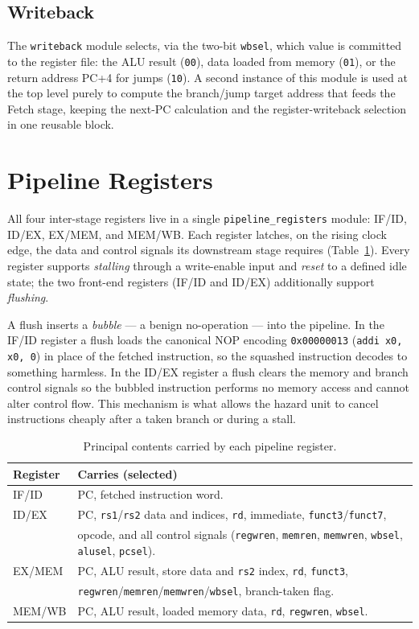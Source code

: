\documentclass[11pt,a4paper]{article}
\newcommand{\code}[1]{\texttt{#1}}          %
\newcommand{\sig}[1]{\texttt{#1}}
\newcommand{\hex}[1]{\texttt{0x#1}}
\begin{document}
\subsection{Writeback}
The \code{writeback} module selects, via the two-bit \sig{wbsel}, which value is committed
to the register file: the ALU result (\sig{00}), data loaded from memory (\sig{01}), or
the return address PC+4 for jumps (\sig{10}). A second instance of this module is used at
the top level purely to compute the branch/jump target address that feeds the Fetch stage,
keeping the next-PC calculation and the register-writeback selection in one reusable block.

\section{Pipeline Registers}
\label{sec:pipelinereg}
All four inter-stage registers live in a single \code{pipeline\_registers} module: IF/ID,
ID/EX, EX/MEM, and MEM/WB. Each register latches, on the rising clock edge, the data and
control signals its downstream stage requires (Table~\ref{tab:pregs}). Every register
supports \emph{stalling} through a write-enable input and \emph{reset} to a defined idle
state; the two front-end registers (IF/ID and ID/EX) additionally support \emph{flushing}.

A flush inserts a \emph{bubble} --- a benign no-operation --- into the pipeline. In the
IF/ID register a flush loads the canonical NOP encoding \hex{00000013} (\sig{addi x0, x0,
0}) in place of the fetched instruction, so the squashed instruction decodes to something
harmless. In the ID/EX register a flush clears the memory and branch control signals so
the bubbled instruction performs no memory access and cannot alter control flow. This
mechanism is what allows the hazard unit to cancel instructions cheaply after a taken
branch or during a stall.

\begin{table}[h]
\centering
\caption{Principal contents carried by each pipeline register.}
\label{tab:pregs}
\small
\begin{tabular}{@{}l l@{}}
\toprule
\textbf{Register} & \textbf{Carries (selected)} \\
\midrule
IF/ID  & PC, fetched instruction word. \\
ID/EX  & PC, \sig{rs1}/\sig{rs2} data and indices, \sig{rd}, immediate, \sig{funct3}/\sig{funct7}, \\
       & opcode, and all control signals (\sig{regwren}, \sig{memren}, \sig{memwren}, \sig{wbsel}, \sig{alusel}, \sig{pcsel}). \\
EX/MEM & PC, ALU result, store data and \sig{rs2} index, \sig{rd}, \sig{funct3}, \\
       & \sig{regwren}/\sig{memren}/\sig{memwren}/\sig{wbsel}, branch-taken flag. \\
MEM/WB & PC, ALU result, loaded memory data, \sig{rd}, \sig{regwren}, \sig{wbsel}. \\
\bottomrule
\end{tabular}
\end{table}
\end{document}
